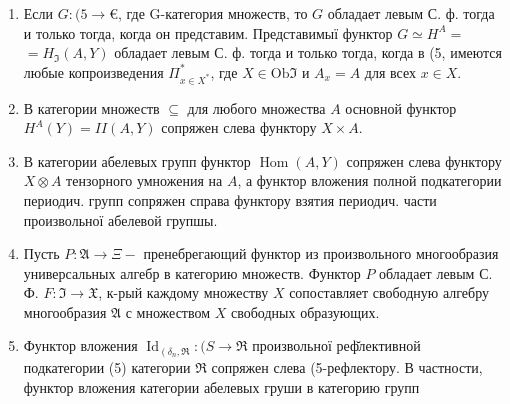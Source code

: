 \documentclass[10pt]{article}
\begin{document}
\begin{enumerate}

  \item Если $G:(5 \rightarrow €$, где G-категория множеств, то $G$ обладает левым С. ф. тогда и только тогда, когда он представим. Представимыї функтор $G \simeq H^{A}=$ $=H_{\Im}(A, Y)$ обладает левым С. ф. тогда и только тогда, когда в (5, имеются любые копроизведения $\Pi_{x \in X^{*}}^{*}$, где $X \in \mathrm{Ob} \Im$ и $A_{x}=A$ для всех $x \in X$.



  \item В категории множеств $\subseteq$ для любого множества $A$ основной функтор $H^{A}(Y)=I I(A, Y)$ сопряжен слева функтору $X \times A$.



  \item В категории абелевых групп функтор $\operatorname{Hom}(A, Y)$ сопряжен слева функтору $X \otimes A$ тензорного умножения на $A$, а функтор вложения полной подкатегории периодич. групп сопряжен справа функтору взятия периодич. части произвольної абелевой групшы.



  \item Пусть $P: \mathfrak{A} \rightarrow \Xi-$ пренебрегающий функтор из произвольного многообразия универсальных алгебр в категорию множеств. Функтор $P$ обладает левым С. Ф. $F: \Im \rightarrow \mathfrak{X}$, к-рый каждому множеству $X$ сопоставляет свободную алгебру многообразия $\mathfrak{A}$ с множеством $X$ свободных образующих.



  \item Функтор вложения $\operatorname{Id}_{\left(\delta_{n}, \mathfrak{\Re}\right.}:(S \rightarrow \Re$ произвольної реф̆лективной подкатегории (5) категории $\mathfrak{R}$ сопряжен слева (5-рефлектору. В частности, функтор вложения категории абелевых груши в категорию групп



\end{enumerate}
\end{document}
